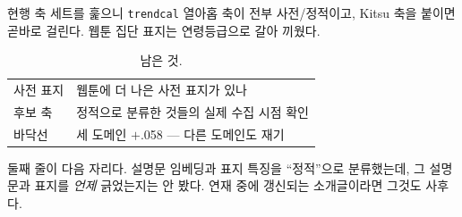 \documentclass[10pt]{article}
\begin{document}
현행 축 세트를 훑으니 \texttt{trendcal} 열아홉 축이 전부 사전/정적이고,
Kitsu 축을 붙이면 곧바로 걸린다. 웹툰 집단 표지는 연령등급으로 갈아 끼웠다.

\begin{table}[t]
\centering\tsize
\caption{남은 것.}
\begin{tabular}{ll}
\toprule
사전 표지 & 웹툰에 더 나은 사전 표지가 있나 \\
후보 축 & 정적으로 분류한 것들의 실제 수집 시점 확인 \\
바닥선 & 세 도메인 $+$.058 --- 다른 도메인도 재기 \\
\bottomrule
\end{tabular}
\end{table}

둘째 줄이 다음 자리다. 설명문 임베딩과 표지 특징을 ``정적''으로 분류했는데,
그 설명문과 표지를 \emph{언제} 긁었는지는 안 봤다. 연재 중에 갱신되는
소개글이라면 그것도 사후다.
\end{document}
